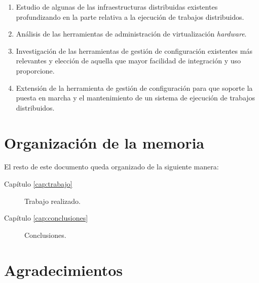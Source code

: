 {\begin{enumerate}
\item Estudio de algunas de las infraestructuras distribuidas existentes profundizando en la parte relativa a la ejecución de trabajos distribuidos.
\item Análisis de las herramientas de administración de virtualización \emph{hardware}.
\item Investigación de las herramientas de gestión de configuración existentes más relevantes y elección de aquella que mayor facilidad de integración y uso proporcione.
\item Extensión de la herramienta de gestión de configuración para que soporte la puesta en marcha y el mantenimiento de un sistema de ejecución de trabajos distribuidos.
\end{enumerate}

\section{Organización de la memoria}

El resto de este documento queda organizado de la siguiente manera:
\begin{description}
\item[Capítulo \ref{cap:trabajo}] Trabajo realizado.
\item[Capítulo \ref{cap:conclusiones}] Conclusiones.
\end{description}


\section{Agradecimientos}

}
